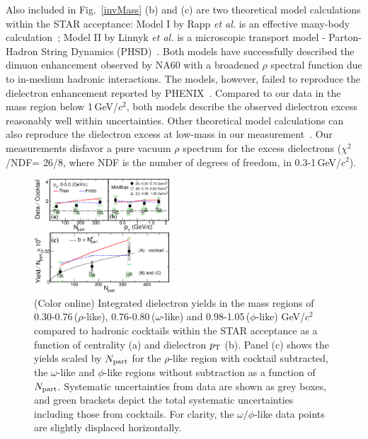 \documentclass[twocolumn,showpacs,amsmath,amssymb,superscriptaddress,nofootinbib]{revtex4-1}
\newcommand{\GeVcsq}{GeV/$c^2$ }
\newcommand{ \pT }{$p_{\rm T}$ }
\begin{document}
Also included in Fig.~\ref{invMass} (b) and (c) are two theoretical model calculations within the STAR acceptance: Model I by Rapp {\it et al.} is an effective many-body calculation~\cite{RappThermalEE,Rapp4SPS,RappPriv};
Model II by Linnyk {\it et al.} is a microscopic transport model - Parton-Hadron String Dynamics (PHSD)~\cite{PHSD,PHSDEE,PHSD4SPS}. Both models have successfully described the dimuon enhancement observed by NA60 with a broadened $\rho$ spectral function due to in-medium hadronic interactions. The models, however, failed to reproduce the dielectron enhancement reported by PHENIX~\cite{PHENIX,PHSDEE}. Compared to our data in the mass region below 1\,GeV/$c^2$, both models describe the observed dielectron excess reasonably well within uncertainties.
Other theoretical model calculations can also reproduce the dielectron excess at low-mass in our measurement~\cite{HJXu,Vujanovic}.
Our measurements disfavor a pure vacuum $\rho$ spectrum for the excess dielectrons ($\chi^{2}$/NDF= 26/8, where NDF is the number of degrees of freedom, in 0.3-1\,GeV/$c^{2}$).

\begin{figure}[h]
\centering
\includegraphics[width=0.45\textwidth] {omega_rho_new.eps}
\caption[]{(Color online) Integrated dielectron yields in the mass regions of 0.30-0.76\,($\rho$-like), 0.76-0.80\,($\omega$-like) and 0.98-1.05\,($\phi$-like) \GeVcsq compared to hadronic cocktails within the STAR acceptance as a function of centrality (a) and dielectron \pT (b). Panel (c) shows the yields scaled by $N_{\rm part}$ for the $\rho$-like region with cocktail subtracted, the $\omega$-like and $\phi$-like regions without subtraction as a function of $N_{\rm part}$. Systematic uncertainties from data are shown as grey boxes, and green brackets depict the total systematic uncertainties including those from cocktails. For clarity, the $\omega/\phi$-like data points are slightly displaced horizontally.}
\label{enhanceCent}
\end{figure}
\end{document}
